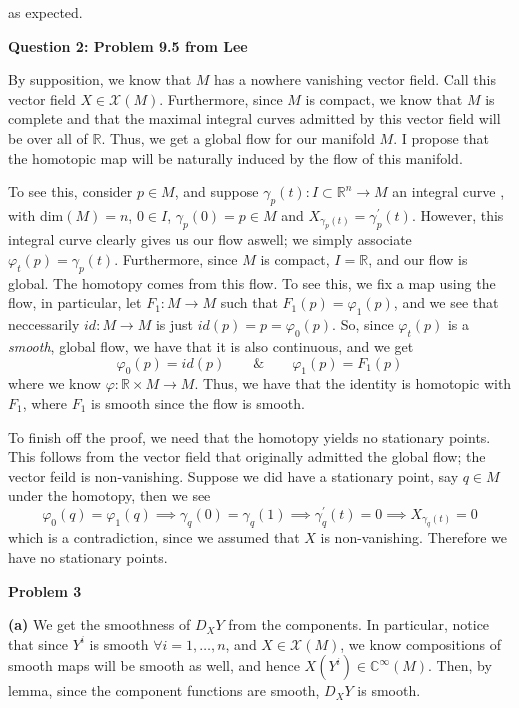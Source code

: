 \documentclass[10pt]{article}
\newcommand{\R}{\mathbb{R}}
\newcommand{\C}{\mathbb{C}}
\begin{document}
as expected.


\newpage
\textbf{Question 2: Problem 9.5 from Lee} 

By supposition, we know that $M$ has a nowhere vanishing vector field. Call this vector field $X\in \mathcal{X}(M)$. Furthermore, since $M$ is compact, we know that $M$ is complete and that the maximal integral curves admitted by this vector field will be over all of $\R$. Thus, we get a global flow for our manifold $M$. I propose that the homotopic map will be naturally induced by the flow of this manifold.

To see this, consider $p\in M$, and suppose $\gamma_{p}(t) : I\subset \R^{n} \to M$ an integral curve , with dim$(M) = n$, $0\in I$, $\gamma_{p}(0) = p \in M$ and $X_{\gamma_{p}(t)} = \gamma_{p}^{\prime}(t)$. However, this integral curve clearly gives us our flow aswell; we simply associate $\varphi_{t}(p) = \gamma_{p}(t)$. Furthermore, since $M$ is compact, $I = \R$, and our flow is global. The homotopy comes from this flow. To see this, we fix a map using the flow, in particular, let $F_{1}: M \to M$ such that $F_{1}(p) = \varphi_{1}(p)$, and we see that neccessarily $id: M \to M$ is just $id(p) = p = \varphi_{0}(p)$. So, since $\varphi_{t}(p)$ is a \textit{smooth}, global flow, we have that it is also continuous, and we get
\[ \varphi_{0}(p) = id(p) \hspace{2em} \& \hspace{2em} \varphi_{1}(p) = F_{1}(p) \]
where we know $\varphi: \R \times M \to M$. Thus, we have that the identity is homotopic with $F_{1}$, where $F_{1}$ is smooth since the flow is smooth.

To finish off the proof, we need that the homotopy yields no stationary points. This follows from the vector field that originally admitted the global flow; the vector feild is non-vanishing. Suppose we did have a stationary point, say $q\in M$ under the homotopy, then we see
\[ \varphi_{0}(q) = \varphi_{1}(q) \implies \gamma_{q}(0) = \gamma_{q}(1) \implies \gamma_{q}^{\prime}(t) = 0 \implies X_{\gamma_{q}(t)} = 0 \]
which is a contradiction, since we assumed that $X$ is non-vanishing. Therefore we have no stationary points.

\newpage
\textbf{Problem 3}

\textbf{(a)} We get the smoothness of $D_{X}Y$ from the components. In particular, notice that since $Y^{i}$ is smooth $\forall i = 1,\dots,n$, and $X \in \mathcal{X}(M)$, we know compositions of smooth maps will be smooth as well, and hence $X(Y^{i}) \in \C^{\infty}(M)$. Then, by lemma, since the component functions are smooth, $D_{X}Y$ is smooth.
\end{document}
